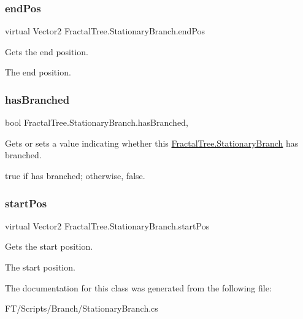 \subsubsection{\texorpdfstring{end\+Pos}{endPos}}
{\footnotesize\ttfamily virtual Vector2 Fractal\+Tree.\+Stationary\+Branch.\+end\+Pos\hspace{0.3cm}{\ttfamily [get]}}



Gets the end position. 

The end position.\mbox{\label{class_fractal_tree_1_1_stationary_branch_aabe8c4ecdd2bcfda07911f37f171e399}} 
\subsubsection{\texorpdfstring{has\+Branched}{hasBranched}}
{\footnotesize\ttfamily bool Fractal\+Tree.\+Stationary\+Branch.\+has\+Branched\hspace{0.3cm}{\ttfamily [get]}, {\ttfamily [set]}}



Gets or sets a value indicating whether this \hyperlink{class_fractal_tree_1_1_stationary_branch}{Fractal\+Tree.\+Stationary\+Branch} has branched. 

{\ttfamily true} if has branched; otherwise, {\ttfamily false}.\mbox{\label{class_fractal_tree_1_1_stationary_branch_a536f1353b6c082d193a12efa88ed3239}} 
\subsubsection{\texorpdfstring{start\+Pos}{startPos}}
{\footnotesize\ttfamily virtual Vector2 Fractal\+Tree.\+Stationary\+Branch.\+start\+Pos\hspace{0.3cm}{\ttfamily [get]}}



Gets the start position. 

The start position.

The documentation for this class was generated from the following file\+:\begin{DoxyCompactItemize}
\item 
F\+T/\+Scripts/\+Branch/Stationary\+Branch.\+cs\end{DoxyCompactItemize}
